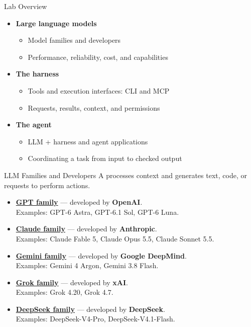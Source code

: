\begin{frame}{Lab Overview}
\begin{itemize}
\item \textbf{Large language models}
  \begin{itemize}
  \item Model families and developers
  \item Performance, reliability, cost, and capabilities
  \end{itemize}
\item \textbf{The harness}
  \begin{itemize}
  \item Tools and execution interfaces: CLI and MCP
  \item Requests, results, context, and permissions
  \end{itemize}
\item \textbf{The agent}
  \begin{itemize}
  \item LLM + harness and agent applications
  \item Coordinating a task from input to checked output
  \end{itemize}
\end{itemize}
\end{frame}
\fi

\begin{frame}{LLM Families and Developers}
\small
A  processes context and generates text, code, or requests to perform actions.
\begin{itemize}
\setlength{\itemsep}{3mm}
\item \href{https://developers.openai.com/api/docs/models}{\textbf{GPT family}} --- developed by \textbf{OpenAI}.\\
Examples: GPT-6 Astra, GPT-6.1 Sol, GPT-6 Luna.
\item \href{https://platform.claude.com/docs/en/models/overview}{\textbf{Claude family}} --- developed by \textbf{Anthropic}.\\
Examples: Claude Fable 5, Claude Opus 5.5, Claude Sonnet 5.5.
\item \href{https://ai.google.dev/gemini-api/docs/models}{\textbf{Gemini family}} --- developed by \textbf{Google DeepMind}.\\
Examples: Gemini 4 Argon, Gemini 3.8 Flash.
\item \href{https://docs.x.ai/developers/models}{\textbf{Grok family}} --- developed by \textbf{xAI}.\\
Examples: Grok 4.20, Grok 4.7.
\item \href{https://api-docs.deepseek.com/quick_start/pricing/}{\textbf{DeepSeek family}} --- developed by \textbf{DeepSeek}.\\
Examples: DeepSeek-V4-Pro, DeepSeek-V4.1-Flash.
\end{itemize}
\end{frame}

